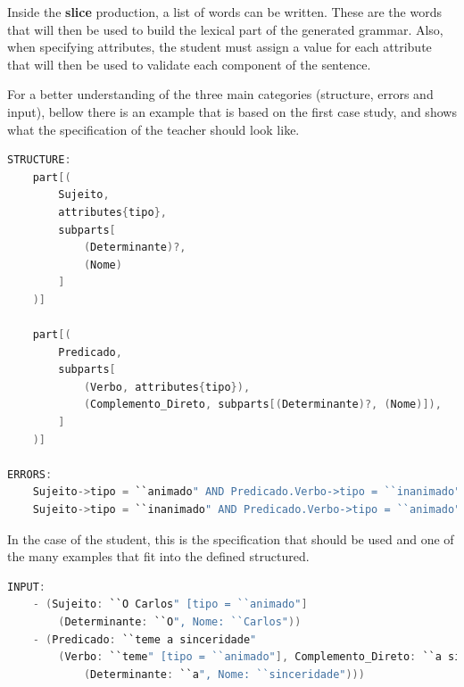 Inside the \textbf{slice} production, a list of words can be written. These are the words that will then be used to build the lexical part of the generated grammar. Also, when specifying attributes, the student must assign a value for each attribute that will then be used to validate each component of the sentence.

For a better understanding of the three main categories (structure, errors and input), bellow there is an example that is based on the first case study, and shows what the specification of the teacher should look like.

\begin{center}
\begin{minipage}{13cm}
\begin{lstlisting}[language=java, basicstyle=\tiny, label={lst:metaStruct}, caption=Example of a possible sentence structure]
STRUCTURE:
	part[(
        Sujeito, 
        attributes{tipo}, 
        subparts[
            (Determinante)?, 
            (Nome)
        ]
	)]
    
	part[(
        Predicado,
        subparts[
            (Verbo, attributes{tipo}),
            (Complemento_Direto, subparts[(Determinante)?, (Nome)]),
        ]
	)]

ERRORS:
    Sujeito->tipo = ``animado" AND Predicado.Verbo->tipo = ``inanimado";
    Sujeito->tipo = ``inanimado" AND Predicado.Verbo->tipo = ``animado";
\end{lstlisting}
\end{minipage}
\end{center}

In the case of the student, this is the specification that should be used and one of the many examples that fit into the defined structured.

\begin{center}
\begin{minipage}{13cm}
\begin{lstlisting}[language=java, basicstyle=\tiny, label={lst:metaInput}, caption=Example of the students parsing]
INPUT:
    - (Sujeito: ``O Carlos" [tipo = ``animado"]
        (Determinante: ``O", Nome: ``Carlos"))
    - (Predicado: ``teme a sinceridade" 
        (Verbo: ``teme" [tipo = ``animado"], Complemento_Direto: ``a sinceridade" 
            (Determinante: ``a", Nome: ``sinceridade")))
\end{lstlisting}
\end{minipage}
\end{center}


